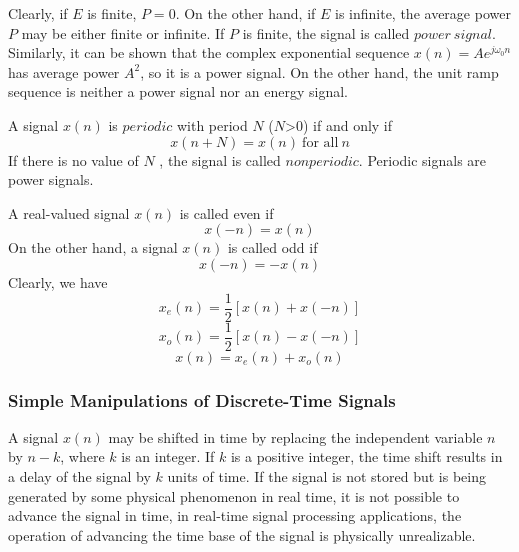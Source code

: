 \documentclass[10pt,a4paper,oneside]{article}
\begin{document}
Clearly, if $E$ is finite, $P = 0$. On the other hand, if $E$ is infinite, the average power $P$ may be either finite or infinite. If $P$ is finite, the signal is called $power\ signal$. Similarly, it can be shown that the complex exponential sequence $x(n)=Ae^{j\omega_0n}$ has average power $A^2$, so it is a power signal. On the other hand, the unit ramp sequence is neither a power signal nor an energy signal.

A signal $x(n)$ is $periodic$ with period $N$ ($N$>0) if and only if
\[
x(n+N)=x(n)\ \text{for all}\ n
\]
If there is no value of $N$ , the signal is called $nonperiodic$. Periodic signals are power signals.

A real-valued signal $x(n)$ is called even if
\[
x(-n)=x(n)
\]
On the other hand, a signal $x(n)$ is called odd if
\[
x(-n) =-x(n)
\]
Clearly, we have
\[
x_e(n)=\frac{1}{2}[x(n)+x(-n)]
\]
\[
x_o(n)=\frac{1}{2}[x(n)-x(-n)]
\]
\[
x(n)=x_e(n)+x_o(n)
\]
\subsubsection{Simple Manipulations of Discrete-Time Signals}
A signal $x(n)$ may be shifted in time by replacing the independent variable $n$ by $n-k$, where $k$ is an integer. If $k$ is a positive integer, the time shift results in a delay of the signal by $k$ units of time. If the signal is not stored but is being generated by some physical phenomenon in real time, it is not possible to advance the signal in time, in real-time signal processing applications, the operation of advancing the time base of the signal is physically unrealizable. 
\end{document}
